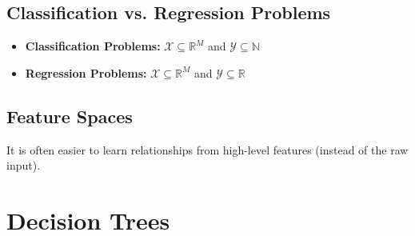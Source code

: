 \documentclass{article}
\begin{document}
\subsection{Classification vs. Regression Problems}
\begin{definition}
    \begin{itemize}
        \item \textbf{Classification Problems:} $\mathcal{X} \subseteq \mathbb{R}^M$ and $\mathcal{Y} \subseteq \mathbb{N}$
        \item \textbf{Regression Problems:} $\mathcal{X} \subseteq \mathbb{R}^M$ and $\mathcal{Y} \subseteq \mathbb{R}$
    \end{itemize}
\end{definition}

\subsection{Feature Spaces}
\begin{definition}
    It is often easier to learn relationships from high-level features (instead of the raw input).
\end{definition}



\section{Decision Trees}

\newpage
\end{document}
